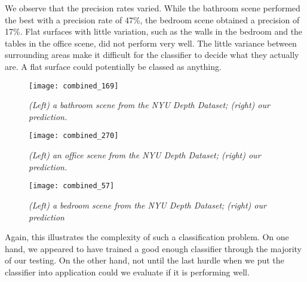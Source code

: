 We observe that the precision rates varied. While the bathroom scene performed the best with a precision rate of 47\%, the bedroom scene obtained a precision of 17\%. Flat surfaces with little variation, such as the walls in the bedroom and the tables in the office scene, did not perform very well. The little variance between surrounding areas make it difficult for the classifier to decide what they actually are. A flat surface could potentially be classed as anything.




\newpage
\begin{figure}[H]
  \centering
  \texttt{[image: combined\_169]}
  \caption{\textit{(Left) a bathroom scene from the NYU Depth Dataset; (right) our prediction.}}
  \label{fig:predict-bathroom}
\end{figure}


\begin{figure}[H]
  \centering
  \texttt{[image: combined\_270]}
  \caption{\textit{(Left) an office scene from the NYU Depth Dataset; (right) our prediction.}}
  \label{fig:predict-office}
\end{figure}


\begin{figure}[H]
  \centering
  \texttt{[image: combined\_57]}
  \caption{\textit{(Left) a bedroom scene from the NYU Depth Dataset; (right) our prediction}}
  \label{fig:predict-bedroom}
\end{figure}

Again, this illustrates the complexity of such a classification problem. On one hand, we appeared to have trained a good enough classifier through the majority of our testing. On the other hand, not until the last hurdle when we put the classifier into application could we evaluate if it is performing well.
